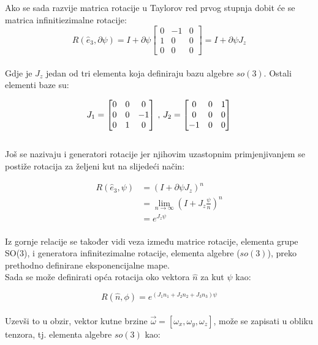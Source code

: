 \documentclass[times, utf8, diplomski]{fer}
\begin{document}
	Ako se sada razvije matrica rotacije u Taylorov red prvog stupnja dobit će se matrica infinitiezimalne rotacije: \\
	\begin{equation}
		R( \hat{e}_3, \partial \psi ) = I + \partial \psi 
		\begin{bmatrix}
			0	&	-1	&	0 \\
			1	&	0	&	0 \\
			0	&	0 	&	0
		\end{bmatrix}
		= I + \partial \psi J_z
	\end{equation}
	\\
	\noindent Gdje je $J_z$ jedan od tri elementa koja definiraju bazu algebre $so(3)$. Ostali elementi baze su:
	
	\begin{equation}
		J_1 = 
		\begin{bmatrix}
		0	&	0	&	0 \\
		0	&	0	&	-1 \\
		0	&	1 	&	0
		\end{bmatrix} \\
		\, , \, J_2 = 
		\begin{bmatrix}
		0	&	0	&	1 \\
		0	&	0	&	0 \\
		-1	&	0 	&	0
		\end{bmatrix} 
	\end{equation}
	\\
	Još se nazivaju i generatori rotacije jer njihovim uzastopnim primjenjivanjem se postiže rotacija za željeni kut na slijedeći način:
	
	\begin{align}
		R( \hat{e}_3, \psi ) & = (I + \partial \psi J_z)^n \\
							 & = \lim_{n \rightarrow \infty} \left (I + J_z \frac{\psi}{n} \right )^n \\
							 & = e^{J_z \psi}
	\end{align}
	\\
	Iz gornje relacije se također vidi veza između matrice rotacije, elementa grupe SO(3), i generatora infinitezimalne rotacije, elementa algebre ($so(3)$), preko prethodno definirane eksponencijalne mape. \\
	Sada se može definirati opća rotacija oko vektora $\hat{n}$ za kut $\psi$ kao:
	
	\begin{equation}
		R( \hat{n}, \phi ) = e^{(J_1 n_1 + J_2 n_2 + J_3 n_3)\psi}
	\end{equation}
	\\
	Uzevši to u obzir, vektor kutne brzine $\vec{\omega} = [\omega_x, \omega_y, \omega_z]$, može se zapisati u obliku tenzora, tj. elementa algebre $so(3)$ kao: 
	
\end{document}

